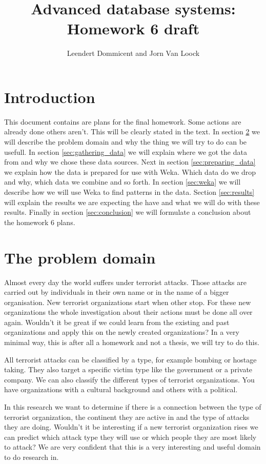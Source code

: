\documentclass[a4]{article}
\title{Advanced database systems: Homework 6 draft}
\author{Leendert Dommicent and Jorn Van Loock}
\date{}
\begin{document}
\maketitle
\setlength{\parindent}{0px}
\setlength{\parskip}{8px}
\section{Introduction}
This document contains are plans for the final homework. Some actions are already done others aren't. This will be clearly stated in the text. In section \ref{sec:problem} we will describe the problem domain and why the thing we will try to do can be usefull. In section \ref{sec:gathering_data} we will explain where we got the data from and why we chose these data sources. Next in section \ref{sec:preparing_data} we explain how the data is prepared for use with Weka. Which data do we drop and why, which data we combine and so forth. In section \ref{sec:weka} we will describe how we will use Weka to find patterns in the data. Section \ref{sec:results} will explain the results we are expecting the have and what we will do with these results. Finally in section \ref{sec:conclusion} we will formulate a conclusion about the homework 6 plans.
\section{The problem domain}
\label{sec:problem}
Almost every day the world suffers under terrorist attacks. Those attacks are carried out by individuals in their own name or in the name of a bigger organisation. New terrorist organizations start when other stop. For these new organizations the whole investigation about their actions must be done all over again. Wouldn't it be great if we could learn from the existing and past organizations and apply this on the newly created organizations? In a very minimal way, this is after all a homework and not a thesis, we will try to do this.\par
All terrorist attacks can be classified by a type, for example bombing or hostage taking. They also target a specific victim type like the government or a private company. We can also classify the different types of terrorist organizations. You have organizations with a cultural background and others with a political.\par
In this research we want to determine if there is a connection between the type of terrorist organization, the continent they are active in and the type of attacks they are doing. Wouldn't it be interesting if a new terrorist organization rises we can predict which attack type they will use or which people they are most likely to attack? We are very confident that this is a very interesting and useful domain to do research in.
\end{document}
